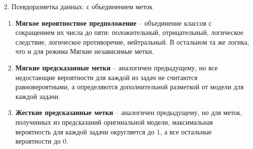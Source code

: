 \begin{frame}{2. Псевдоразметка данных: с объединением меток}
    \begin{enumerate}
\item \textbf{Мягкое вероятностное предположение} -- объединение классов с сокращением их числа до пяти: положительный, отрицательный, логическое следствие, логическое противоречие, нейтральный. В остальном та же логика, что и для режима Мягкие независимые метки.
\item \textbf{Мягкие предсказанные метки} -- аналогичен предыдущему, но все недостающие вероятности для каждой из задач не считаются равновероятными, а определяются дополнительной разметкой от модели для каждой задачи. 
\item \textbf{Жесткие предсказанные метки} -- аналогичен предыдущему, но для меток, полученных из предсказаний оригинальной модели, максимальная вероятность для каждой задачи округляется до 1, а все остальные вероятности до 0.
    \end{enumerate}
\end{frame}

